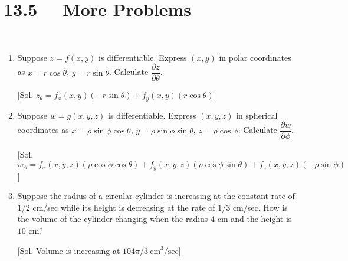 \section*{13.5 \ \ More Problems}

\ 


\begin{enumerate}
\item  Suppose $z = f(x, y)$ is differentiable.  Express $(x, y)$ in polar coordinates as $x = r \cos \theta$, $y = r \sin \theta$.  Calculate $\dfrac{\partial z}{\partial \theta}$.

[Sol. $z_{\theta} = f_x(x,y) (-r \sin \theta) + f_y(x,y) (r \cos \theta)$] \\


\item  Suppose $w = g(x, y, z)$ is differentiable.  Express $(x, y, z)$ in spherical coordinates as $x = \rho \sin \phi \cos \theta$, $y = \rho \sin \phi \sin \theta$, $z = \rho \cos \phi$.  Calculate $\dfrac{\partial w}{\partial \phi}$.


[Sol. $w_{\phi} = f_x(x,y,z)(\rho \cos \phi \cos \theta)  + f_y(x,y,z)(\rho \cos \phi \sin \theta) + f_z(x,y,z)(-\rho \sin \phi)$] \\


\item  Suppose the radius of a circular cylinder is increasing at the constant rate of $1/2$ cm/sec while its height is decreasing at the rate of $1/3$ cm/sec.  How is the volume of the cylinder changing when the radius $4$ cm and the height is $10$ cm?

[Sol. Volume is increasing at $104 \pi/3 \  \text{cm}^3/\text{sec}$]  \\


\end{enumerate}